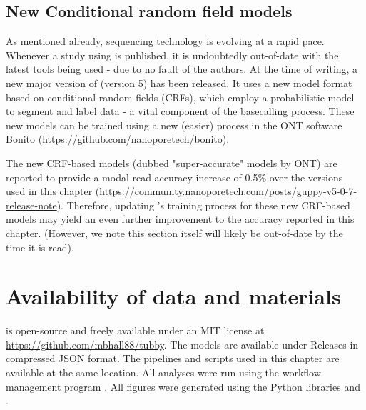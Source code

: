 \subsection{New Conditional random field models}
As mentioned already, \ont{} sequencing technology is evolving at a rapid pace. Whenever a study using \ont{} is published, it is undoubtedly out-of-date with the latest tools being used - due to no fault of the authors. At the time of writing, a new major version of \guppy{} (version 5) has been released. It uses a new model format based on conditional random fields (CRFs), which employ a probabilistic model to segment and label data \cite{Lafferty2001} - a vital component of the basecalling process. These new models can be trained using a new (easier) process in the ONT software Bonito (\url{https://github.com/nanoporetech/bonito}).

The new CRF-based models (dubbed "super-accurate" models by ONT) are reported to provide a modal read accuracy increase of 0.5\% over the \guppy{} versions used in this chapter (\url{https://community.nanoporetech.com/posts/guppy-v5-0-7-release-note}). Therefore, updating \tubby{}'s training process for these new CRF-based models may yield an even further improvement to the accuracy reported in this chapter. (However, we note this section itself will likely be out-of-date by the time it is read). 

\section{Availability of data and materials}


\tubby{} is open-source and freely available under an MIT license at \url{https://github.com/mbhall88/tubby}. The models are available under Releases in compressed JSON format. The pipelines and scripts used in this chapter are available at the same location. All analyses were run using the workflow management program  \cite{snakemake2021}. All figures were generated using the Python libraries  \cite{matplotlib} and  \cite{seaborn}.